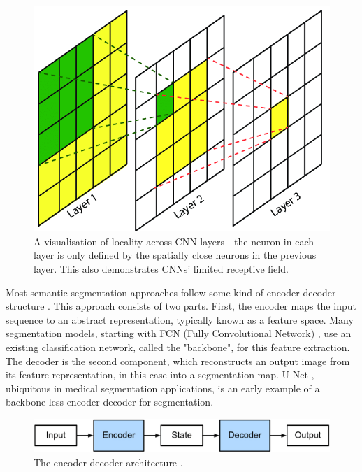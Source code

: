 \documentclass[a4paper,12pt]{report}
\begin{document}
\begin{figure}[ht]
    \centering
    \includegraphics[scale=0.3]{res/receptive-field.png}
    \caption{A visualisation of locality across CNN layers \cite{lin_maritime_2017} - the neuron in each layer is only defined by the spatially close neurons in the previous layer. This also demonstrates CNNs' limited receptive field.}
    \label{fig:receptive_field}
\end{figure}

Most semantic segmentation approaches follow some kind of encoder-decoder structure \cite{zhang_dive_2019}. This approach consists of two parts. First, the encoder maps the input sequence to an abstract representation, typically known as a feature space. Many segmentation models, starting with FCN (Fully Convolutional Network) \cite{long_fully_2015}, use an existing classification network, called the "backbone", for this feature extraction. The decoder is the second component, which reconstructs an output image from its feature representation, in this case into a segmentation map. U-Net \cite{ronneberger_u-net_2015}, ubiquitous in medical segmentation applications, is an early example of a backbone-less encoder-decoder for segmentation.

\begin{figure}[t]
    \centering
    \includegraphics[width=\textwidth]{res/encoder-decoder.png}
    \caption{The encoder-decoder architecture \cite{zhang_dive_2019}.}
    \label{fig:encoder_decoder}
\end{figure}
\end{document}
